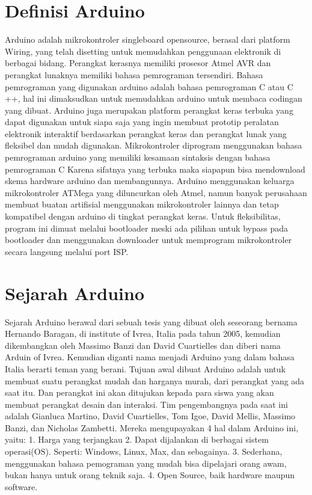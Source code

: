  \section{Definisi Arduino}
  	Arduino adalah mikrokontroler singleboard opensource, berasal dari platform Wiring, yang telah disetting untuk memudahkan penggunaan elektronik di berbagai bidang. Perangkat kerasnya memiliki prosesor Atmel AVR dan perangkat lunaknya memiliki bahasa pemrograman tersendiri. Bahasa pemrograman yang digunakan arduino adalah bahasa pemrograman C atau C ++, hal ini dimaksudkan untuk memudahkan arduino untuk membaca codingan yang dibuat.
  	Arduino juga merupakan platform perangkat keras terbuka yang dapat digunakan untuk siapa saja yang ingin membuat prototip peralatan elektronik interaktif berdasarkan perangkat keras dan perangkat lunak yang fleksibel dan mudah digunakan. Mikrokontroler diprogram menggunakan bahasa pemrograman arduino yang memiliki kesamaan sintaksis dengan bahasa pemrograman C Karena sifatnya yang terbuka maka siapapun bisa mendownload skema hardware arduino dan membangunnya.
 	Arduino menggunakan keluarga mikrokontroler ATMega yang diluncurkan oleh Atmel, namun banyak perusahaan membuat buatan artifisial menggunakan mikrokontroler lainnya dan tetap kompatibel dengan arduino di tingkat perangkat keras. Untuk fleksibilitas, program ini dimuat melalui bootloader meski ada pilihan untuk bypass pada bootloader dan menggunakan downloader untuk memprogram mikrokontroler secara langsung melalui port ISP.\cite{jamieson2010arduino}

 \section{Sejarah Arduino}
 	Sejarah Arduino berawal dari sebuah tesis yang dibuat oleh seseorang bernama Hernando Baragan, di institute of Ivrea, Italia pada tahun 2005, kemudian dikembangkan oleh Massimo Banzi dan David Cuartielles dan diberi nama Arduin of Ivrea. Kemudian diganti nama menjadi Arduino yang dalam bahasa Italia berarti teman yang berani.
 	Tujuan awal dibuat Arduino adalah untuk membuat suatu perangkat mudah dan harganya murah, dari perangkat yang ada saat itu. Dan perangkat ini akan ditujukan kepada para siswa yang akan membuat perangkat desain dan interaksi.
 	Tim pengembangnya pada saat ini adalah Gianluca Martino, David Cuartielles, Tom Igoe, David Mellis, Massimo Banzi, dan Nicholas Zambetti. Mereka mengupayakan 4 hal dalam Arduino ini, yaitu:
 	1.	Harga yang terjangkau
 	2.	Dapat dijalankan di berbagai sistem operasi(OS). Seperti: Windows, Linux, Max, dan sebagainya.
 	3.	Sederhana, menggunakan bahasa pemograman yang mudah bisa dipelajari orang awam, bukan hanya untuk orang teknik saja.
 	4.	Open Source, baik hardware maupun software.

